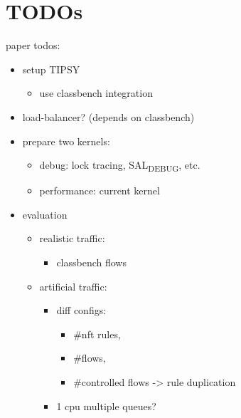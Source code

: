 \documentclass[11pt]{article}
\begin{document}
\section*{TODOs}
\label{sec:orga29c1fc}
paper todos:
\begin{itemize}
\item setup TIPSY
\begin{itemize}
\item use classbench integration
\end{itemize}
\item load-balancer? (depends on classbench)
\item prepare two kernels:
\begin{itemize}
\item debug: lock tracing, SAL\textsubscript{DEBUG}, etc.
\item performance: current kernel
\end{itemize}
\item evaluation
\begin{itemize}
\item realistic traffic:
\begin{itemize}
\item classbench flows
\end{itemize}
\item artificial traffic:
\begin{itemize}
\item diff configs:
\begin{itemize}
\item \#nft rules,
\item \#flows,
\item \#controlled flows -> rule duplication
\end{itemize}
\item 1 cpu multiple queues?
\end{itemize}
\end{itemize}
\end{itemize}
\end{document}

